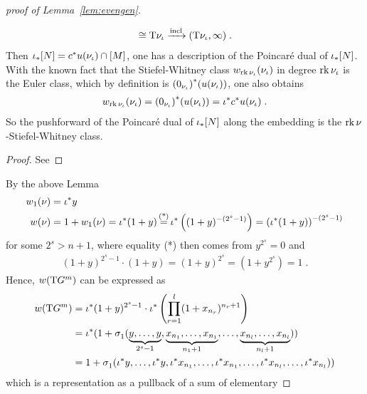 \begin{proof}[proof of
  Lemma~\ref{lem:evengen}]
\begin{Lem}
\begin{gather*}
      \cong \mathrm{T}{\nu_{{\iota}}}
      \xrightarrow{\mathrm{incl}} (\mathrm{T}{\nu_{{\iota}}},\infty)
      \;.
    \end{gather*}
    Then
    ${{\iota}}_*[N] = {c}^*{u}(\nu_{{\iota}})\cap[M]$,
    \idest one has a description of the Poincaré dual of
    ${{\iota}}_*[N]$.
    With the known fact that the Stiefel-Whitney class
    ${w_{\operatorname{rk}\nu_{{\iota}}}}(\nu_{{\iota}})$ in degree $\operatorname{rk}{\nu_{{\iota}}}$ is the
    Euler class, which by definition is
    ${(0_{\nu_{{\iota}}})}^*({u}(\nu_{{\iota}}))$, one also obtains
    \begin{gather*}
      {w_{\operatorname{rk}\nu_{{\iota}}}}(\nu_{{\iota}})
      = {(0_{\nu_{{\iota}}})}^*({u}(\nu_{{\iota}}))
      = {{\iota}}^*{c}^*{u}(\nu_{{\iota}})
      \;.
    \end{gather*}
    So the pushforward of the Poincaré dual of ${{\iota}}_*[N]$
    along the embedding is the $\operatorname{rk}\nu_{}$-Stiefel-Whitney class.
    \begin{proof}
      See \forexample
    \end{proof}
  \end{Lem}
  By the above Lemma
  \begin{align*}
    \w1{\N{}}
    &= \pb\emb y \\
    \W{\N{}}
    &= 1 + \w1{\N{}}
      = \pb\emb(1+y)
      \cequalsby{(*)} \pb\emb\left((1+y)^{-(2^s-1)}\right)
      = \left(\pb\emb(1+y)\right)^{-(2^s-1)}
  \end{align*}
  for some $2^s>n+1$, where equality (*) then comes from $y^{2^s}=0$ and
  \begin{gather*}
    (1+y)^{2^s-1} \cdot (1+y)
    = (1+y)^{2^s}
    = (1+y^{2^s})
    = 1
    \;.
  \end{gather*}
  Hence, ${w}(\mathrm{T}G^{m})$ can be expressed as
  \begin{align*}
    {w}(\mathrm{T}G^{m})
    &= {{\iota}}^*(1+y)^{2^s-1}
      \cdot {{\iota}}^*\left(
      \prod_{r=1}^{l}(1+x_{n_r})^{n_r+1}
      \right) \\
    &= {{\iota}}^*(1 + \sigma_{1}^{}(
      \underbrace{y,\dotsc,y}_{2^s-1},
      \underbrace{x_{n_1},\dotsc,x_{n_1}}_{n_1+1},
      \dotsc,
      \underbrace{x_{n_{l}},\dotsc,x_{n_{l}}}_{n_{l}+1}
      )) \\
    &= 1 + \sigma_{1}^{}(
      {{\iota}}^* y,\dotsc,{{\iota}}^* y,
      {{\iota}}^* x_{n_1},\dotsc, {{\iota}}^* x_{n_1},
      \dotsc,
      {{\iota}}^* x_{n_l},\dotsc, {{\iota}}^* x_{n_l}
      ))
  \end{align*}
  which is a representation as a pullback of a sum of elementary

\end{proof}
